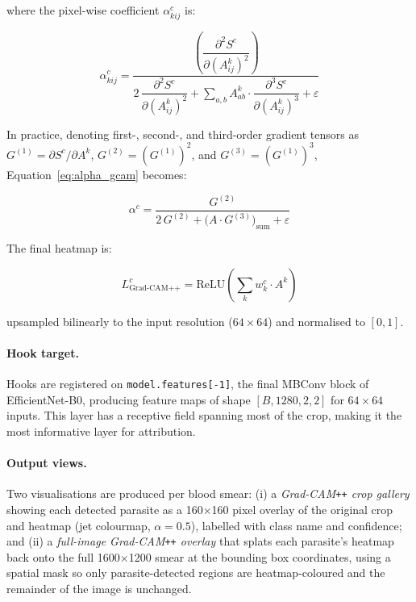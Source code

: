 \documentclass[10pt,twocolumn]{article}
\begin{document}
where the pixel-wise coefficient $\alpha_{kij}^c$ is:

\begin{equation}
  \alpha_{kij}^c = \frac{
    \left(\dfrac{\partial^2 S^c}{\partial (A_{ij}^k)^2}\right)
  }{
    2\,\dfrac{\partial^2 S^c}{\partial (A_{ij}^k)^2}
    + \displaystyle\sum_{a,b} A_{ab}^k \cdot
    \dfrac{\partial^3 S^c}{\partial (A_{ij}^k)^3} + \varepsilon
  }
  \label{eq:alpha_gcam}
\end{equation}

In practice, denoting first-, second-, and third-order gradient tensors
as $G^{(1)} = \partial S^c / \partial A^k$, $G^{(2)} = (G^{(1)})^2$,
and $G^{(3)} = (G^{(1)})^3$, Equation~\ref{eq:alpha_gcam} becomes:

\begin{equation}
  \alpha^c = \frac{G^{(2)}}{2\,G^{(2)}
  + \bigl(A \cdot G^{(3)}\bigr)_{\text{sum}} + \varepsilon}
  \label{eq:alpha_gcam_compact}
\end{equation}

The final heatmap is:

\begin{equation}
  L^c_{\text{Grad-CAM++}} = \text{ReLU}
  \!\left(\sum_k w_k^c \cdot A^k\right)
  \label{eq:gcampp_cam}
\end{equation}

upsampled bilinearly to the input resolution ($64 \times 64$) and
normalised to $[0, 1]$.

\paragraph{Hook target.}
Hooks are registered on \texttt{model.features[-1]}, the final MBConv
block of EfficientNet-B0, producing feature maps of shape $[B, 1280, 2, 2]$
for $64\times 64$ inputs. This layer has a receptive field spanning most
of the crop, making it the most informative layer for attribution.

\paragraph{Output views.}
Two visualisations are produced per blood smear:
(i) a \textit{Grad-CAM\texttt{++} crop gallery} showing each detected
parasite as a 160$\times$160 pixel overlay of the original crop and
heatmap (jet colourmap, $\alpha = 0.5$), labelled with class name and
confidence; and
(ii) a \textit{full-image Grad-CAM\texttt{++} overlay} that splats each
parasite's heatmap back onto the full 1600$\times$1200 smear at the
bounding box coordinates, using a spatial mask so only parasite-detected
regions are heatmap-coloured and the remainder of the image is unchanged.
\end{document}
